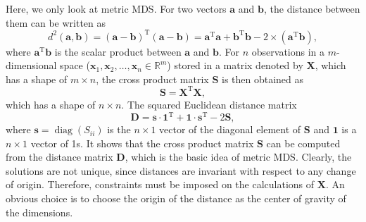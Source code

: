 Here, we only look at metric MDS. For two vectors $\mathbf{a}$ and $\mathbf{b}$, the distance between them can be written as
\begin{equation}
	d^2(\mathbf{a},\mathbf{b})=(\mathbf{a}-\mathbf{b})^{\operatorname{T}}(\mathbf{a}-\mathbf{b})=\mathbf{a}^{\operatorname{T}}\mathbf{a}+\mathbf{b}^{\operatorname{T}}\mathbf{b}-2\times(\mathbf{a}^{\operatorname{T}}\mathbf{b}),
\end{equation}
where $\mathbf{a}^{\operatorname{T}}\mathbf{b}$ is the scalar product between $\mathbf{a}$ and $\mathbf{b}$. For $n$ observations in a $m$-dimensional space ($\mathbf{x}_1, \mathbf{x}_2, \dots, \mathbf{x}_n\in \mathbb{R}^m$) stored in a matrix denoted by $\mathbf{X}$, which has a shape of $m\times n$, the cross product matrix $\mathbf{S}$ is then obtained as
\begin{equation}
	\mathbf{S}=\mathbf{X}^{\operatorname{T}}\mathbf{X},
\end{equation}
which has a shape of $n\times n$. The squared Euclidean distance matrix
\begin{equation}
	\mathbf{D}=\mathbf{s}\cdot\mathbf{1}^{\operatorname{T}}+\mathbf{1}\cdot\mathbf{s}^{\operatorname{T}}-2\mathbf{S},
	\label{eq:DR:MDS:D_vs_S}
\end{equation}
where $\mathbf{s}=\operatorname{diag}(S_{ii})$ is the $n\times 1$ vector of the diagonal element of $\mathbf{S}$ and $\mathbf{1}$ is a $n\times 1$ vector of 1s. It shows that the cross product matrix $\mathbf{S}$ can be computed from the distance matrix $\mathbf{D}$, which is the basic idea of metric MDS. Clearly, the solutions are not unique, since distances are invariant with respect to any change of origin. Therefore, constraints must be imposed on the calculations of $\mathbf{X}$. An obvious choice is to choose the origin of the distance as the center of gravity of the dimensions.

